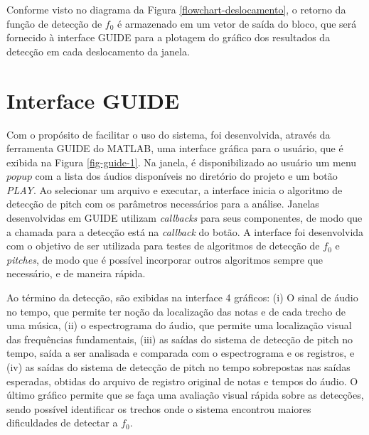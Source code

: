 Conforme visto no diagrama da Figura \ref{flowchart-deslocamento}, o retorno da função de detecção de $f_0$ é armazenado em um vetor de saída do bloco, que será fornecido à interface GUIDE para a plotagem do gráfico dos resultados da detecção em cada deslocamento da janela.


\section{Interface GUIDE}

Com o propósito de facilitar o uso do sistema, foi desenvolvida, através da ferramenta GUIDE\cite{mathworks2018guide} do MATLAB\rreg, uma interface gráfica para o usuário, que é exibida na Figura \ref{fig-guide-1}. Na janela, é disponibilizado ao usuário um menu $popup$ com a lista dos áudios disponíveis no diretório do projeto e um botão \textit{PLAY}. Ao selecionar um arquivo e executar, a interface inicia o algoritmo de detecção de pitch com os parâmetros necessários para a análise. Janelas desenvolvidas em GUIDE utilizam \textit{callbacks} para seus componentes, de modo que a chamada para a detecção está na \textit{callback} do botão. A interface foi desenvolvida com o objetivo de ser utilizada para testes de algoritmos de detecção de $f_0$ e \textit{pitches}, de modo que é possível incorporar outros algoritmos sempre que necessário, e de maneira rápida.


Ao término da detecção, são exibidas na interface 4 gráficos: (i) O sinal de áudio no tempo, que permite ter noção da localização das notas e de cada trecho de uma música, (ii) o espectrograma do áudio, que permite uma localização visual das frequências fundamentais, (iii) as saídas do sistema de detecção de pitch no tempo, saída a ser analisada e comparada com o espectrograma e os registros, e (iv) as saídas do sistema de detecção de pitch no tempo sobrepostas nas saídas esperadas, obtidas do arquivo de registro original de notas e tempos do áudio. O último gráfico permite que se faça uma avaliação visual rápida sobre as detecções, sendo possível identificar os trechos onde o sistema encontrou maiores dificuldades de detectar a $f_0$.

